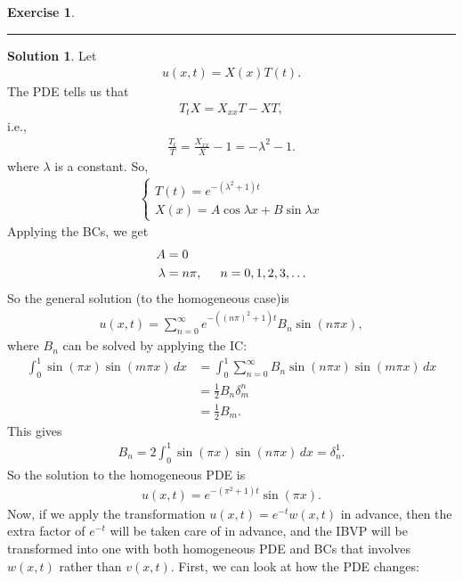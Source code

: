 \documentclass{book}
\theoremstyle{definition}
\newtheorem*{exer*}{Exercise}
\newtheorem*{sln*}{Solution}
\newcommand{\f}[2]{\frac{#1}{#2}}
\begin{document}
\begin{exer*}
	\noindent\rule{\textwidth}{0.5pt}
	\begin{sln*}
		Let
		\begin{align*}
		u(x,t) = X(x)T(t).
		\end{align*}
		The PDE tells us that
		\begin{align*}
		T_t X = X_{xx} T - XT,
		\end{align*}
		i.e.,
		\begin{align*}
		\f{T_t}{T} = \f{X_{xx}}{X} - 1 = -\lambda^2 - 1.
		\end{align*}
		where $\lambda$ is a constant. So,
		\begin{align*}
		\begin{cases}
		T(t) = e^{-(\lambda^2 + 1)t}\\
		X(x) = A\cos\lambda x + B\sin\lambda x
		\end{cases}
		\end{align*}
		Applying the BCs, we get
		\begin{align*}
		A &= 0\\
		\lambda &= n\pi, \hspace{0.5cm} n = 0,1,2,3,\dots
		\end{align*}
		So the general solution (to the homogeneous case)is
		\begin{align*}
		u(x,t) = \sum_{n=0}^\infty e^{-((n\pi)^2 + 1)  t}B_n \sin(n\pi x),
		\end{align*}
		where $B_n$ can be solved by applying the IC:
		\begin{align*}
		\int^1_0 \sin(\pi x)\sin(m\pi x)\,dx &= \int^1_0 \sum_{n=0}^\infty B_n \sin(n\pi x)\sin(m\pi x)\,dx\\
		&= \frac{1}{2}B_n \delta^n_m\\
		&= \frac{1}{2}B_m.
		\end{align*}
		This gives
		\begin{align*}
		B_n = 2\int^1_0 \sin(\pi x)\sin(n\pi x)\,dx = \delta^1_n.
		\end{align*}
		So the solution to the homogeneous PDE is
		\begin{align*}
		\boxed{u(x,t) = e^{-(\pi^2 + 1) t}\sin(\pi x)}.
		\end{align*}
		Now, if we apply the transformation $u(x,t) = e^{-t}w(x,t)$ in advance, then the extra factor of $e^{-t}$ will be taken care of in advance, and the IBVP will be transformed into one with both homogeneous PDE and BCs that involves $w(x,t)$ rather than $v(x,t)$. First, we can look at how the PDE changes:
		\begin{align*}

\end{align*}
\end{sln*}
\end{exer*}
\end{document}
